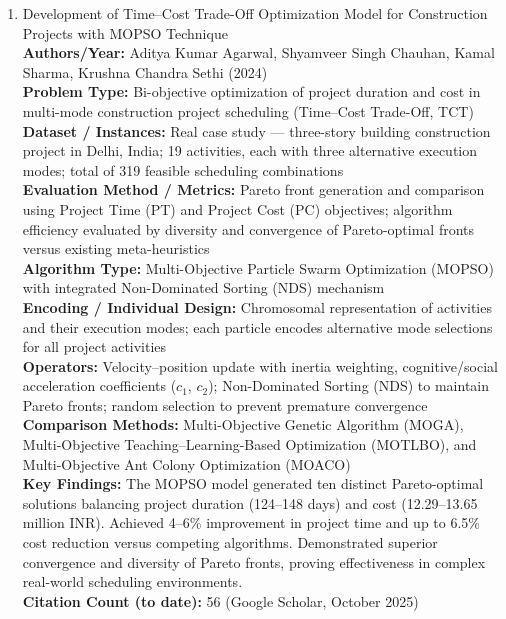 \documentclass[a4paper,12pt]{article}
\begin{document}
\begin{enumerate}[leftmargin=2em, labelwidth=1em, labelsep=0.5em, itemsep=1ex]
  \item Development of Time–Cost Trade-Off Optimization Model for Construction Projects with MOPSO Technique \\
    \textbf{Authors/Year:} Aditya Kumar Agarwal, Shyamveer Singh Chauhan, Kamal Sharma, Krushna Chandra Sethi (2024) \\  
    \textbf{Problem Type:} Bi-objective optimization of project duration and cost in multi-mode construction project scheduling (Time–Cost Trade-Off, TCT) \\  
    \textbf{Dataset / Instances:} Real case study — three-story building construction project in Delhi, India; 19 activities, each with three alternative execution modes; total of 319 feasible scheduling combinations \\  
    \textbf{Evaluation Method / Metrics:} Pareto front generation and comparison using Project Time (PT) and Project Cost (PC) objectives; algorithm efficiency evaluated by diversity and convergence of Pareto-optimal fronts versus existing meta-heuristics \\  
    \textbf{Algorithm Type:} Multi-Objective Particle Swarm Optimization (MOPSO) with integrated Non-Dominated Sorting (NDS) mechanism \\  
    \textbf{Encoding / Individual Design:} Chromosomal representation of activities and their execution modes; each particle encodes alternative mode selections for all project activities \\  
    \textbf{Operators:} Velocity–position update with inertia weighting, cognitive/social acceleration coefficients ($c_1$, $c_2$); Non-Dominated Sorting (NDS) to maintain Pareto fronts; random selection to prevent premature convergence \\  
    \textbf{Comparison Methods:} Multi-Objective Genetic Algorithm (MOGA), Multi-Objective Teaching–Learning-Based Optimization (MOTLBO), and Multi-Objective Ant Colony Optimization (MOACO) \\  
    \textbf{Key Findings:} The MOPSO model generated ten distinct Pareto-optimal solutions balancing project duration (124–148 days) and cost (12.29–13.65 million INR). Achieved 4–6\% improvement in project time and up to 6.5\% cost reduction versus competing algorithms. Demonstrated superior convergence and diversity of Pareto fronts, proving effectiveness in complex real-world scheduling environments. \\  
    \textbf{Citation Count (to date):} 56 (Google Scholar, October 2025) \\[2ex]
    

\end{enumerate}
\end{document}
